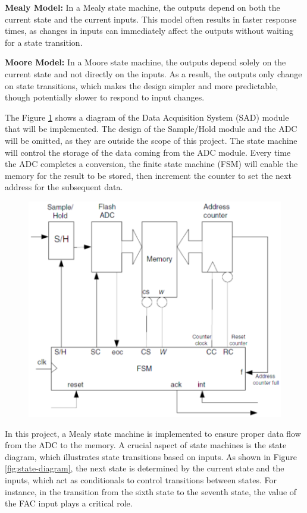 \documentclass[conference]{IEEEtran}
\begin{document}
	\textbf{Mealy Model:} In a Mealy state machine, the outputs depend on both the current state and the current inputs. This model often results in faster response times, as changes in inputs can immediately affect the outputs without waiting for a state transition.\cite{mano_digital_2002}
	
	\textbf{Moore Model:} In a Moore state machine, the outputs depend solely on the current state and not directly on the inputs. As a result, the outputs only change on state transitions, which makes the design simpler and more predictable, though potentially slower to respond to input changes.\cite{mano_digital_2002}
	
	The Figure \ref{fig:sad-module} shows a diagram of the Data Acquisition System (SAD) module that will be implemented. The design of the Sample/Hold module and the ADC will be omitted, as they are outside the scope of this project. The state machine will control the storage of the data coming from the ADC module. Every time the ADC completes a conversion, the finite state machine (FSM) will enable the memory for the result to be stored, then increment the counter to set the next address for the subsequent data.
	
    \begin{figure}[H]
		\centering
		\includegraphics[width=0.9\columnwidth]{"Files/SAD Module"}
		\caption{}
		\label{fig:sad-module}
	\end{figure}
	
	In this project, a Mealy state machine is implemented to ensure proper data flow from the ADC to the memory. A crucial aspect of state machines is the state diagram, which illustrates state transitions based on inputs. As shown in Figure \ref{fig:state-diagram}, the next state is determined by the current state and the inputs, which act as conditionals to control transitions between states. For instance, in the transition from the sixth state to the seventh state, the value of the FAC input plays a critical role.
	
\end{document}
